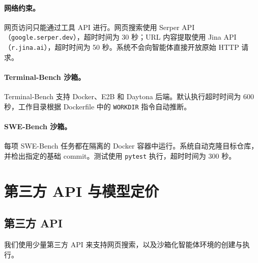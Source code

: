 \paragraph{网络约束。}
网页访问只能通过工具 API 进行。网页搜索使用 Serper API（\texttt{google.serper.dev}），超时时间为 30 秒；URL 内容提取使用 Jina API（\texttt{r.jina.ai}），超时时间为 50 秒。系统不会向智能体直接开放原始 HTTP 请求。

\paragraph{Terminal-Bench 沙箱。}
Terminal-Bench 支持 Docker、E2B 和 Daytona 后端。默认执行超时时间为 600 秒，工作目录根据 Dockerfile 中的 \texttt{WORKDIR} 指令自动推断。

\paragraph{SWE-Bench 沙箱。}
每项 SWE-Bench 任务都在隔离的 Docker 容器中运行。系统自动克隆目标仓库，并检出指定的基础 commit。测试使用 \texttt{pytest} 执行，超时时间为 300 秒。




\section{第三方 API 与模型定价}
\label{app:E}

\subsection{第三方 API}
\label{app:E1}


我们使用少量第三方 API 来支持网页搜索，以及沙箱化智能体环境的创建与执行。

